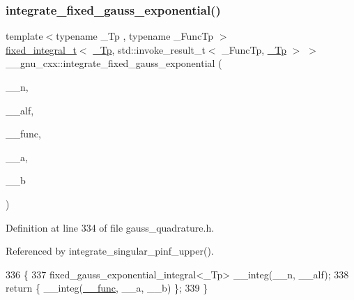 \subsubsection{\texorpdfstring{integrate\+\_\+fixed\+\_\+gauss\+\_\+exponential()}{integrate\_fixed\_gauss\_exponential()}}
{\footnotesize\ttfamily template$<$typename \+\_\+\+Tp , typename \+\_\+\+Func\+Tp $>$ \\
\hyperlink{struct____gnu__cxx_1_1fixed__integral__t}{fixed\+\_\+integral\+\_\+t}$<$ \hyperlink{namespace____gnu__cxx_a3b19a9c800ca194374ef9172290f7d79}{\+\_\+\+Tp}, std\+::invoke\+\_\+result\+\_\+t$<$ \+\_\+\+Func\+Tp, \hyperlink{namespace____gnu__cxx_a3b19a9c800ca194374ef9172290f7d79}{\+\_\+\+Tp} $>$ $>$ \+\_\+\+\_\+gnu\+\_\+cxx\+::integrate\+\_\+fixed\+\_\+gauss\+\_\+exponential (\begin{DoxyParamCaption}\item[{int}]{\+\_\+\+\_\+n,  }\item[{\hyperlink{namespace____gnu__cxx_a3b19a9c800ca194374ef9172290f7d79}{\+\_\+\+Tp}}]{\+\_\+\+\_\+alf,  }\item[{\+\_\+\+Func\+Tp}]{\+\_\+\+\_\+func,  }\item[{\hyperlink{namespace____gnu__cxx_a3b19a9c800ca194374ef9172290f7d79}{\+\_\+\+Tp}}]{\+\_\+\+\_\+a,  }\item[{\hyperlink{namespace____gnu__cxx_a3b19a9c800ca194374ef9172290f7d79}{\+\_\+\+Tp}}]{\+\_\+\+\_\+b }\end{DoxyParamCaption})}



Definition at line 334 of file gauss\+\_\+quadrature.\+h.



Referenced by integrate\+\_\+singular\+\_\+pinf\+\_\+upper().


\begin{DoxyCode}
336     \{
337       fixed\_gauss\_exponential\_integral<\_Tp> \_\_integ(\_\_n, \_\_alf);
338       \textcolor{keywordflow}{return} \{ \_\_integ(\hyperlink{namespace____gnu__cxx_af2b2f0c7a2ae72b922b1afefae5a65b2}{\_\_func}, \_\_a, \_\_b) \};
339     \}
\end{DoxyCode}
\mbox{\label{namespace____gnu__cxx_aaf74d571f8c3ccc7a6c7f7c64e9edb29}} 
